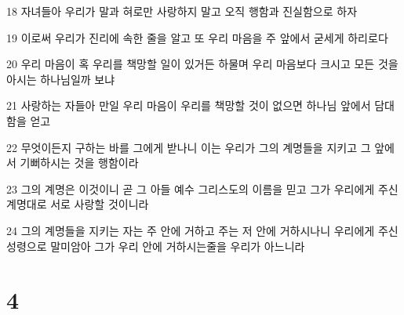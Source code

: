\par 18 자녀들아 우리가 말과 혀로만 사랑하지 말고 오직 행함과 진실함으로 하자
\par 19 이로써 우리가 진리에 속한 줄을 알고 또 우리 마음을 주 앞에서 굳세게 하리로다
\par 20 우리 마음이 혹 우리를 책망할 일이 있거든 하물며 우리 마음보다 크시고 모든 것을 아시는 하나님일까 보냐
\par 21 사랑하는 자들아 만일 우리 마음이 우리를 책망할 것이 없으면 하나님 앞에서 담대함을 얻고
\par 22 무엇이든지 구하는 바를 그에게 받나니 이는 우리가 그의 계명들을 지키고 그 앞에서 기뻐하시는 것을 행함이라
\par 23 그의 계명은 이것이니 곧 그 아들 예수 그리스도의 이름을 믿고 그가 우리에게 주신 계명대로 서로 사랑할 것이니라
\par 24 그의 계명들을 지키는 자는 주 안에 거하고 주는 저 안에 거하시나니 우리에게 주신 성령으로 말미암아 그가 우리 안에 거하시는줄을 우리가 아느니라

\chapter{4}


